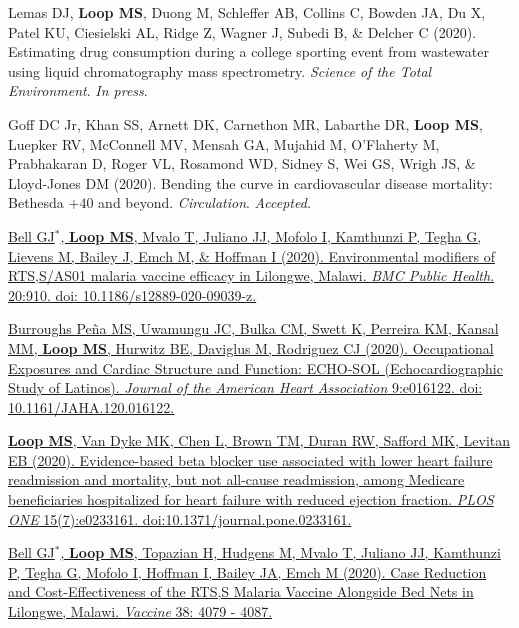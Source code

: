 \documentclass[10pt,letterpaper]{article}
\begin{document}
\begin{etaremune}

\item Lemas DJ, \textbf{Loop MS}, Duong M, Schleffer AB, Collins C, Bowden JA, Du X, Patel KU, Ciesielski AL, Ridge Z, Wagner J, Subedi B, \& Delcher C (2020). Estimating drug consumption during a college sporting event from wastewater using liquid chromatography mass spectrometry. \emph{Science of the Total Environment}. \emph{In press}.

\item Goff DC Jr, Khan SS, Arnett DK, Carnethon MR, Labarthe DR, \textbf{Loop MS}, Luepker RV, McConnell MV, Mensah GA, Mujahid M, O'Flaherty M, Prabhakaran D, Roger VL, Rosamond WD, Sidney S, Wei GS, Wrigh JS, \& Lloyd-Jones DM (2020). Bending the curve in cardiovascular disease mortality: Bethesda $+40$ and beyond. \emph{Circulation}. \emph{Accepted}.

\item \href{https://bmcpublichealth.biomedcentral.com/articles/10.1186/s12889-020-09039-z}{Bell GJ$^*$, \textbf{Loop MS}, Mvalo T, Juliano JJ, Mofolo I, Kamthunzi P, Tegha G, Lievens M, Bailey J, Emch M, \& Hoffman I (2020). Environmental modifiers of RTS,S/AS01 malaria vaccine efficacy in Lilongwe, Malawi. \emph{BMC Public Health}. 20:910. doi: 10.1186/s12889-020-09039-z.}

\item \href{https://www.ahajournals.org/doi/pdf/10.1161/JAHA.120.016122}{Burroughs Pe\~{n}a MS, Uwamungu JC, Bulka CM, Swett K, Perreira KM, Kansal MM, \textbf{Loop MS}, Hurwitz BE, Daviglus M, Rodriguez CJ (2020). Occupational Exposures and Cardiac Structure and Function: ECHO-SOL (Echocardiographic Study of Latinos). \emph{Journal of the American Heart Association} 9:e016122. doi: 10.1161/JAHA.120.016122.}

\item \href{https://journals.plos.org/plosone/article?id=10.1371/journal.pone.0233161}{\textbf{Loop MS}, Van Dyke MK, Chen L, Brown TM, Duran RW, Safford MK, Levitan EB (2020). Evidence-based beta blocker use associated with lower heart failure readmission and mortality, but not all-cause readmission, among Medicare beneficiaries hospitalized for heart failure with reduced ejection fraction. \emph{PLOS ONE} 15(7):e0233161. doi:10.1371/journal.pone.0233161.}

\item \href{https://www.sciencedirect.com/science/article/pii/S0264410X20305119}{Bell GJ$^*$, \textbf{Loop MS}, Topazian H, Hudgens M, Mvalo T, Juliano JJ, Kamthunzi P, Tegha G, Mofolo I, Hoffman I, Bailey JA, Emch M (2020). Case Reduction and Cost-Effectiveness of the RTS,S Malaria Vaccine Alongside Bed Nets in Lilongwe, Malawi. \emph{Vaccine} 38: 4079 - 4087.}


\end{etaremune}
\end{document}
